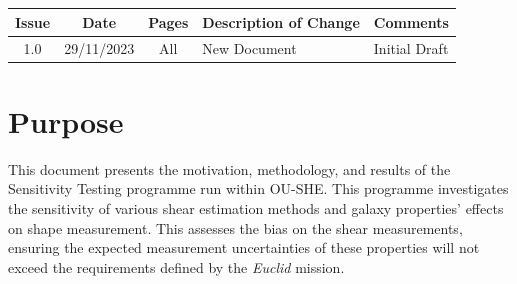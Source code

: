 \documentclass[11pt]{EuclidVIS}
\numberwithin{table}{section}
\numberwithin{figure}{section}
\begin{document}
\newpage



\section*{}
\section*{}

\vspace{+0.3cm}
\noindent
\begin{tabularx}{1.0\textwidth}{ | c | c | c | X | l |}
\hline
\rowcolor{gray!30}
\textbf{Issue} & \textbf{Date} & \textbf{Pages} & \textbf{Description of Change} & \textbf{Comments}\\
\hline
1.0 & 29/11/2023 & All & New Document & Initial Draft \\
\hline
\end{tabularx}

\newpage


\renewcommand*{\contentsname}{\color{MidnightBlue}{Table of Contents}}
\setcounter{tocdepth}{3}
\setlength{\cftbeforetoctitleskip}{-1em}
\tableofcontents
{} 
\thispagestyle{fancy}

\newpage

\section*{Purpose}
This document presents the motivation, methodology, and results of the
Sensitivity Testing programme run within OU-SHE. This programme investigates
the sensitivity of various shear estimation methods and galaxy properties'
effects on shape measurement. This assesses the bias on the shear measurements,
ensuring the expected measurement uncertainties of these properties will not
exceed the requirements defined by the \textit{Euclid} mission.
\end{document}
